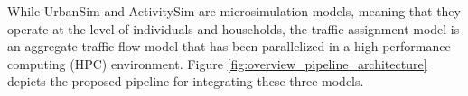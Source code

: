 While UrbanSim and ActivitySim are microsimulation models, meaning that they operate at the level of individuals and households, the traffic assignment model is an aggregate traffic flow model that has been parallelized in a high-performance computing (HPC) environment. Figure \ref{fig:overview_pipeline_architecture} depicts the proposed pipeline for integrating these three models.
